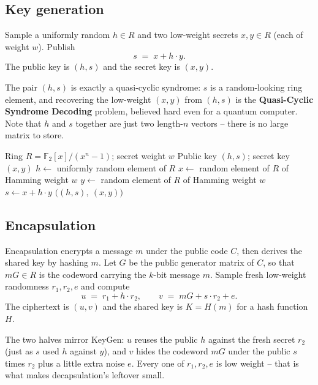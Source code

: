 \subsection{Key generation}

Sample a uniformly random $h \in R$ and two low-weight secrets $x, y \in R$ (each of weight $w$). Publish
\[
s \;=\; x + h\cdot y .
\]
The public key is $(h, s)$ and the secret key is $(x, y)$.

The pair $(h, s)$ is exactly a quasi-cyclic syndrome: $s$ is a random-looking ring element, and recovering the low-weight $(x, y)$ from $(h, s)$ is the \textbf{Quasi-Cyclic Syndrome Decoding} problem, believed hard even for a quantum computer. Note that $h$ and $s$ together are just two length-$n$ vectors -- there is no large matrix to store.

\begin{algorithm}[H]
\caption{HQC KeyGen (teaching form)}
\label{alg:hqc-keygen}
\begin{algorithmic}[1]
\Require Ring $R=\mathbb{F}_2[x]/(x^n-1)$; secret weight $w$
\Ensure Public key $(h,s)$; secret key $(x,y)$
\State $h \gets$ uniformly random element of $R$
\State $x \gets$ random element of $R$ of Hamming weight $w$
\State $y \gets$ random element of $R$ of Hamming weight $w$
\State $s \gets x + h\cdot y$ 
\State \Return $\big((h,s),\ (x,y)\big)$
\end{algorithmic}
\end{algorithm}

\subsection{Encapsulation}

Encapsulation encrypts a message $m$ under the public code $C$, then derives the shared key by hashing $m$. Let $G$ be the public generator matrix of $C$, so that $mG \in R$ is the codeword carrying the $k$-bit message $m$. Sample fresh low-weight randomness $r_1, r_2, e$ and compute
\[
u \;=\; r_1 + h\cdot r_2, \qquad
v \;=\; mG + s\cdot r_2 + e .
\]
The ciphertext is $(u, v)$ and the shared key is $K = H(m)$ for a hash function $H$.

The two halves mirror KeyGen: $u$ reuses the public $h$ against the fresh secret $r_2$ (just as $s$ used $h$ against $y$), and $v$ hides the codeword $mG$ under the public $s$ times $r_2$ plus a little extra noise $e$. Every one of $r_1, r_2, e$ is low weight -- that is what makes decapsulation's leftover small.

